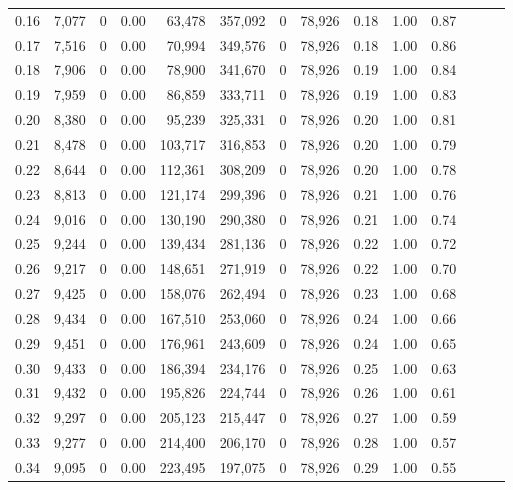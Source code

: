 \begin{tabular}{rrrrrrrrrrrrrr}
0.16 &  7,077 &      0 &  0.00 &   63,478 &  357,092 &       0 &  78,926 &  0.18 &  1.00 &      0.87 \\
0.17 &  7,516 &      0 &  0.00 &   70,994 &  349,576 &       0 &  78,926 &  0.18 &  1.00 &      0.86 \\
0.18 &  7,906 &      0 &  0.00 &   78,900 &  341,670 &       0 &  78,926 &  0.19 &  1.00 &      0.84 \\
0.19 &  7,959 &      0 &  0.00 &   86,859 &  333,711 &       0 &  78,926 &  0.19 &  1.00 &      0.83 \\
0.20 &  8,380 &      0 &  0.00 &   95,239 &  325,331 &       0 &  78,926 &  0.20 &  1.00 &      0.81 \\
0.21 &  8,478 &      0 &  0.00 &  103,717 &  316,853 &       0 &  78,926 &  0.20 &  1.00 &      0.79 \\
0.22 &  8,644 &      0 &  0.00 &  112,361 &  308,209 &       0 &  78,926 &  0.20 &  1.00 &      0.78 \\
0.23 &  8,813 &      0 &  0.00 &  121,174 &  299,396 &       0 &  78,926 &  0.21 &  1.00 &      0.76 \\
0.24 &  9,016 &      0 &  0.00 &  130,190 &  290,380 &       0 &  78,926 &  0.21 &  1.00 &      0.74 \\
0.25 &  9,244 &      0 &  0.00 &  139,434 &  281,136 &       0 &  78,926 &  0.22 &  1.00 &      0.72 \\
0.26 &  9,217 &      0 &  0.00 &  148,651 &  271,919 &       0 &  78,926 &  0.22 &  1.00 &      0.70 \\
0.27 &  9,425 &      0 &  0.00 &  158,076 &  262,494 &       0 &  78,926 &  0.23 &  1.00 &      0.68 \\
0.28 &  9,434 &      0 &  0.00 &  167,510 &  253,060 &       0 &  78,926 &  0.24 &  1.00 &      0.66 \\
0.29 &  9,451 &      0 &  0.00 &  176,961 &  243,609 &       0 &  78,926 &  0.24 &  1.00 &      0.65 \\
0.30 &  9,433 &      0 &  0.00 &  186,394 &  234,176 &       0 &  78,926 &  0.25 &  1.00 &      0.63 \\
0.31 &  9,432 &      0 &  0.00 &  195,826 &  224,744 &       0 &  78,926 &  0.26 &  1.00 &      0.61 \\
0.32 &  9,297 &      0 &  0.00 &  205,123 &  215,447 &       0 &  78,926 &  0.27 &  1.00 &      0.59 \\
0.33 &  9,277 &      0 &  0.00 &  214,400 &  206,170 &       0 &  78,926 &  0.28 &  1.00 &      0.57 \\
0.34 &  9,095 &      0 &  0.00 &  223,495 &  197,075 &       0 &  78,926 &  0.29 &  1.00 &      0.55 \\

\end{tabular}
